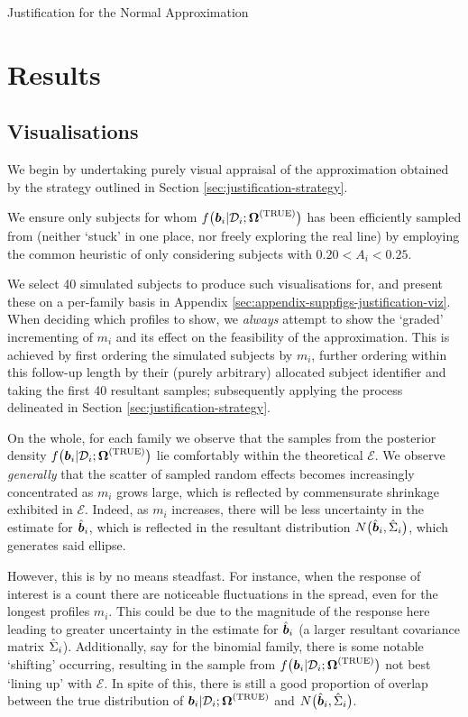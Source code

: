 \begin{chapter}{\label{cha:justification}Justification for the Normal Approximation}
  \section{Results}\label{sec:justification-results}
  \subsection{Visualisations}\label{sec:justification-results-visualisations}
  We begin by undertaking purely visual appraisal of the approximation obtained by the strategy outlined in Section \ref{sec:justification-strategy}. 
  
  We ensure only subjects for whom $f\big(\bm{b}_i|\mathcal{D}_i;\bm{\mathrm{\Omega}}^{(\mathrm{TRUE})}\big)$ has been efficiently sampled from (\ie neither `stuck' in one place, nor freely exploring the real line) by employing the common heuristic of only considering subjects with $0.20<A_i<0.25$. 
  
  We select 40 simulated subjects to produce such visualisations for, and present these on a per-family basis in Appendix \ref{sec:appendix-suppfigs-justification-viz}. When deciding which profiles to show, we \textit{always} attempt to show the `graded' incrementing of $m_i$ and its effect on the feasibility of the approximation. This is achieved by first ordering the simulated subjects by $m_i$, further ordering within this follow-up length by their (purely arbitrary) allocated subject identifier and taking the first 40 resultant samples; subsequently applying the process delineated in Section \ref{sec:justification-strategy}.

  On the whole, for each family we observe that the samples from the posterior density $f\big(\bm{b}_i|\mathcal{D}_i;\bm{\mathrm{\Omega}}^{(\mathrm{TRUE})}\big)$ lie comfortably within the theoretical $\mathcal{E}$. We observe \textit{generally} that the scatter of sampled random effects becomes increasingly concentrated as $m_i$ grows large, which is reflected by commensurate shrinkage exhibited in $\mathcal{E}$. Indeed, as $m_i$ increases, there will be less uncertainty in the estimate for $\hat{\bm{b}}_i$, which is reflected in the resultant distribution $N\big(\hat{\bm{b}}_i,\hat{\Sigma}_i\big)$, which generates said ellipse. 

  However, this is by no means steadfast. For instance, when the response of interest is a count there are noticeable fluctuations in the spread, even for the longest profiles $m_i$. This could be due to the magnitude of the response here leading to greater uncertainty in the estimate for $\hat{\bm{b}}_i$ (\ie a larger resultant covariance matrix $\hat{\Sigma}_i$). Additionally, say for the binomial family, there is some notable `shifting' occurring, resulting in the sample from $f\big(\bm{b}_i|\mathcal{D}_i;\bm{\mathrm{\Omega}}^{(\mathrm{TRUE})}\big)$ not best `lining up' with $\mathcal{E}$. In spite of this, there is still a good proportion of overlap between the true distribution of $\bm{b}_i|\mathcal{D}_i;\bm{\mathrm{\Omega}}^{(\mathrm{TRUE})}$ and $N\big(\hat{\bm{b}}_i,\hat{\Sigma}_i\big)$.


\end{chapter}
